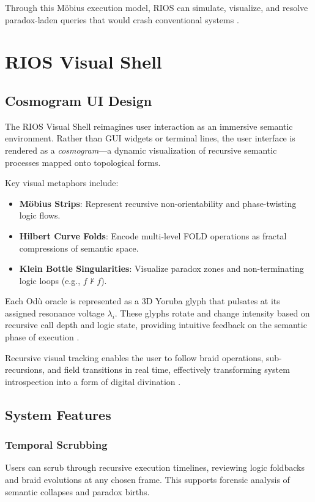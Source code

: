 \documentclass[12]{amsart}
\theoremstyle{plain}
\begin{document}
Through this Möbius execution model, RIOS can simulate, visualize, and resolve paradox-laden queries that would crash conventional systems \cite{hofstadter1979godel, wheeler1983law}.

\section{RIOS Visual Shell}

\subsection{Cosmogram UI Design}

The RIOS Visual Shell reimagines user interaction as an immersive semantic environment. Rather than GUI widgets or terminal lines, the user interface is rendered as a \textit{cosmogram}—a dynamic visualization of recursive semantic processes mapped onto topological forms.

Key visual metaphors include:

\begin{itemize}
    \item \textbf{Möbius Strips}: Represent recursive non-orientability and phase-twisting logic flows.
    \item \textbf{Hilbert Curve Folds}: Encode multi-level FOLD operations as fractal compressions of semantic space.
    \item \textbf{Klein Bottle Singularities}: Visualize paradox zones and non-terminating logic loops (e.g., $f \nvdash f$).
\end{itemize}

Each Odù oracle is represented as a 3D Yoruba glyph that pulsates at its assigned resonance voltage $\lambda_i$. These glyphs rotate and change intensity based on recursive call depth and logic state, providing intuitive feedback on the semantic phase of execution \cite{abimbola1997ifaism, olodumare2004divination}.

Recursive visual tracking enables the user to follow braid operations, sub-recursions, and field transitions in real time, effectively transforming system introspection into a form of digital divination \cite{ritchie2017braid}.

\subsection{System Features}

\subsubsection*{Temporal Scrubbing}
Users can scrub through recursive execution timelines, reviewing logic foldbacks and braid evolutions at any chosen frame. This supports forensic analysis of semantic collapses and paradox births.
\end{document}
